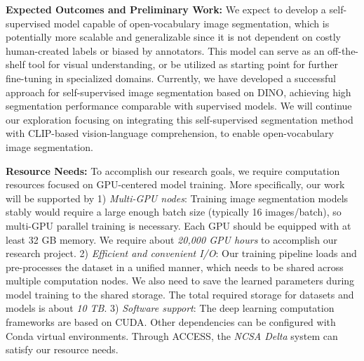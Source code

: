 \noindent\textbf{Expected Outcomes and Preliminary Work:}
We expect to develop a self-supervised model capable of open-vocabulary image segmentation, which is potentially more scalable and generalizable since it is not dependent on costly human-created labels or biased by annotators. This model can serve as an off-the-shelf tool for visual understanding, or be utilized as starting point for further fine-tuning in specialized domains. Currently, we have developed a successful approach for self-supervised image segmentation based on DINO, achieving high segmentation performance comparable with supervised models. We will continue our exploration focusing on integrating this self-supervised segmentation method with CLIP-based vision-language comprehension, to enable open-vocabulary image segmentation.

\noindent\textbf{Resource Needs:} To accomplish our research goals, we require computation resources focused on GPU-centered model training. More specifically, our work will be supported by 1) \emph{Multi-GPU nodes}: Training image segmentation models stably would require a large enough batch size (typically 16 images/batch), so multi-GPU parallel training is necessary. Each GPU should be equipped with at least 32 GB memory. We require about \emph{20,000 GPU hours} to accomplish our research project. 2) \emph{Efficient and convenient I/O}: Our training pipeline loads and pre-processes the dataset in a unified manner, which needs to be shared across multiple computation nodes. We also need to save the learned parameters during model training to the shared storage. The total required storage for datasets and models is about \emph{10 TB}. 3) \emph{Software support}: The deep learning computation frameworks are based on CUDA. Other dependencies can be configured with Conda virtual environments. Through ACCESS, the \emph{NCSA Delta} system can satisfy our resource needs.
